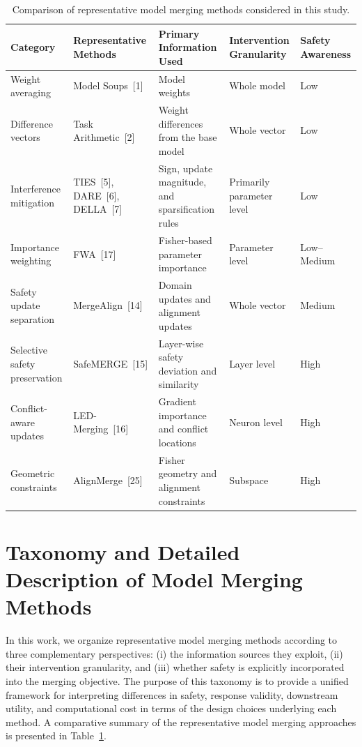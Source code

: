 \documentclass{article}
\begin{document}
\color{black}
\begin{table}[t]
\centering
\caption{Comparison of representative model merging methods considered in this study.}
\label{tab:method-comparison-revised}
\small
\begin{tabular}{p{2.3cm}p{2.7cm}p{2.8cm}p{2.0cm}p{1.8cm}}
\toprule
\textbf{Category} & \textbf{Representative Methods} & \textbf{Primary Information Used} & \textbf{Intervention Granularity} & \textbf{Safety Awareness} \\
\midrule
Weight averaging & Model Soups~[1] & Model weights & Whole model & Low \\
Difference vectors & Task Arithmetic~[2] & Weight differences from the base model & Whole vector & Low \\
Interference mitigation & TIES~[5], DARE~[6], DELLA~[7] & Sign, update magnitude, and sparsification rules & Primarily parameter level & Low \\
Importance weighting & FWA~[17] & Fisher-based parameter importance & Parameter level & Low--Medium \\
Safety update separation & MergeAlign~[14] & Domain updates and alignment updates & Whole vector & Medium \\
Selective safety preservation & SafeMERGE~[15] & Layer-wise safety deviation and similarity & Layer level & High \\
Conflict-aware updates & LED-Merging~[16] & Gradient importance and conflict locations & Neuron level & High \\
Geometric constraints & AlignMerge~[25] & Fisher geometry and alignment constraints & Subspace & High \\
\bottomrule
\end{tabular}
\end{table}

\section{Taxonomy and Detailed Description of Model Merging Methods}
\label{app:method-taxonomy-and-details}

In this work, we organize representative model merging methods according to three complementary perspectives: (i) the information sources they exploit, (ii) their intervention granularity, and (iii) whether safety is explicitly incorporated into the merging objective. The purpose of this taxonomy is to provide a unified framework for interpreting differences in safety, response validity, downstream utility, and computational cost in terms of the design choices underlying each method. A comparative summary of the representative model merging approaches is presented in Table~\ref{tab:method-comparison-revised}.
\end{document}
